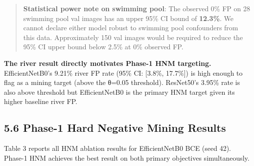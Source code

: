 \documentclass[
  11pt,
]{article}
\begin{document}
\begin{quote}
\textbf{Statistical power note on swimming pool}: The observed 0\% FP on
28 swimming pool val images has an upper 95\% CI bound of
\textbf{12.3\%}. We cannot declare either model robust to swimming pool
confounders from this data. Approximately 150 val images would be
required to reduce the 95\% CI upper bound below 2.5\% at 0\% observed
FP.
\end{quote}

\textbf{The river result directly motivates Phase-1 HNM targeting.}
EfficientNetB0's 9.21\% river FP rate (95\% CI: {[}3.8\%, 17.7\%{]}) is
high enough to flag as a mining target (above the θ=0.05 threshold).
ResNet50's 3.95\% rate is also above threshold but EfficientNetB0 is the
primary HNM target given its higher baseline river FP.

\subsection{5.6 Phase-1 Hard Negative Mining
Results}\label{phase-1-hard-negative-mining-results}

Table 3 reports all HNM ablation results for EfficientNetB0 BCE (seed
42). Phase-1 HNM achieves the best result on both primary objectives
simultaneously.
\end{document}

